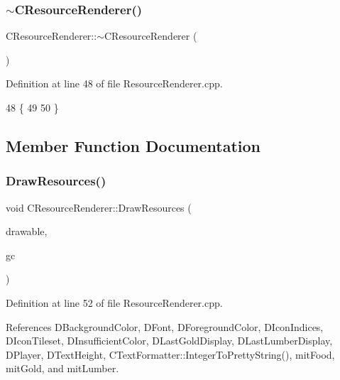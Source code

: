 \subsubsection{\texorpdfstring{$\sim$\+C\+Resource\+Renderer()}{~CResourceRenderer()}}
{\footnotesize\ttfamily C\+Resource\+Renderer\+::$\sim$\+C\+Resource\+Renderer (\begin{DoxyParamCaption}{ }\end{DoxyParamCaption})}



Definition at line 48 of file Resource\+Renderer.\+cpp.


\begin{DoxyCode}
48                                      \{
49 
50 \}
\end{DoxyCode}


\subsection{Member Function Documentation}
\hypertarget{classCResourceRenderer_ad10676ab10fe217aebbc3dca68d745b0}{}\label{classCResourceRenderer_ad10676ab10fe217aebbc3dca68d745b0} 
\subsubsection{\texorpdfstring{Draw\+Resources()}{DrawResources()}}
{\footnotesize\ttfamily void C\+Resource\+Renderer\+::\+Draw\+Resources (\begin{DoxyParamCaption}\item[{Gdk\+Drawable $\ast$}]{drawable,  }\item[{Gdk\+GC $\ast$}]{gc }\end{DoxyParamCaption})}



Definition at line 52 of file Resource\+Renderer.\+cpp.



References D\+Background\+Color, D\+Font, D\+Foreground\+Color, D\+Icon\+Indices, D\+Icon\+Tileset, D\+Insufficient\+Color, D\+Last\+Gold\+Display, D\+Last\+Lumber\+Display, D\+Player, D\+Text\+Height, C\+Text\+Formatter\+::\+Integer\+To\+Pretty\+String(), mit\+Food, mit\+Gold, and mit\+Lumber.


